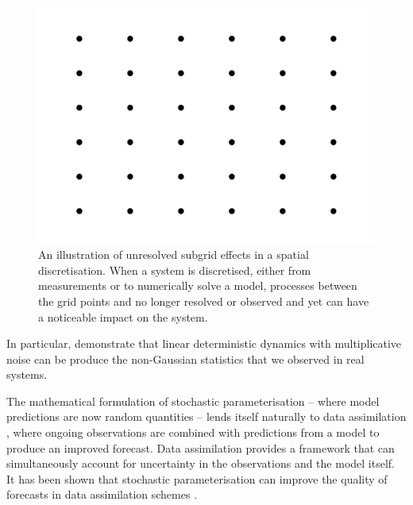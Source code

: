 \begin{figure}
	\begin{center}
		\includegraphics[width=\textwidth]{chp02_background/figures/gridpoints.pdf}
		\caption{An illustration of unresolved subgrid effects in a spatial discretisation.
			When a system is discretised, either from measurements or to numerically solve a model, processes between the grid points and no longer resolved or observed and yet can have a noticeable impact on the system.}
		\label{fig:subgrid_effects}
	\end{center}
\end{figure}


In particular, \citet{SuraEtAl_2005_MultiplicativeNoiseNonGaussianity} demonstrate that linear deterministic dynamics with multiplicative noise can be produce the non-Gaussian statistics that we observed in real systems.

The mathematical formulation of stochastic parameterisation -- where model predictions are now random quantities -- lends itself naturally to data assimilation \citep{BudhirajaEtAl_2019_AssimilatingDataModels,Jazwinski_2014_StochasticProcessesFiltering,LawEtAl_2015_DataAssimilationMathematical,ReichCotter_2015_ProbabilisticForecastingBayesian}, where ongoing observations are combined with predictions from a model to produce an improved forecast.
Data assimilation provides a framework that can simultaneously account for uncertainty in the observations and the model itself.
It has been shown that stochastic parameterisation can improve the quality of forecasts in data assimilation schemes \citep{MitchellGottwald_2012_DataAssimilationSlow,HaEtAl_2015_ComparisonModelError}.

